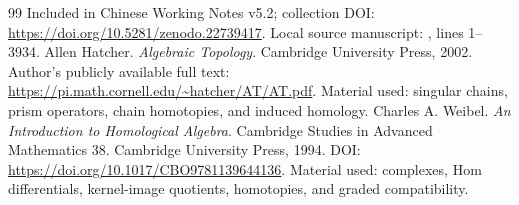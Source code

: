 \documentclass[12pt,a4paper,openany,notitlepage]{report}
\theoremstyle{plain}
\theoremstyle{definition}
\theoremstyle{remark}
\begin{document}
\begin{CJK*}
\begin{thebibliography} {99}
\newblock Included in Chinese Working Notes v5.2; collection DOI: \url{https://doi.org/10.5281/zenodo.22739417}.
\newblock Local source manuscript: , lines 1--3934.
 Allen Hatcher. \emph {Algebraic Topology}. Cambridge University Press, 2002.
\newblock Author's publicly available full text: \url{https://pi.math.cornell.edu/~hatcher/AT/AT.pdf}.
\newblock Material used: singular chains, prism operators, chain homotopies, and induced homology.
 Charles A. Weibel. \emph {An Introduction to Homological Algebra}. Cambridge Studies in Advanced Mathematics 38. Cambridge University Press, 1994.
\newblock DOI: \url{https://doi.org/10.1017/CBO9781139644136}.
\newblock Material used: complexes, Hom differentials, kernel-image quotients, homotopies, and graded compatibility.


\end{thebibliography}
\end{CJK*}
\end{document}
